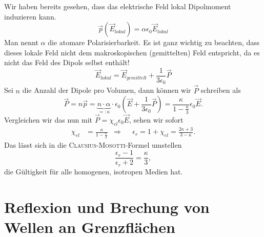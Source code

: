 Wir haben bereits gesehen, dass das elektrische Feld lokal Dipolmoment induzieren kann.
\begin{equation*}
\vec{p}\left(\vec{E}_\textit{lokal}\right) = \alpha\epsilon_0\vec{E}_\textit{lokal}
\end{equation*}
Man nennt $\alpha$ die atomare Polarisierbarkeit. Es ist ganz wichtig zu beachten, dass dieses lokale Feld nicht dem makroskopischen (gemittelten) Feld entspricht, da es nicht das Feld des Dipols selbst enthält! \\
\begin{equation*}
\vec{E}_\textit{lokal}=\vec{E}_\textit{gemittelt} + \frac{1}{3\epsilon_0}\vec{P}
\end{equation*}
Sei $n$ die Anzahl der Dipole pro Volumen, dann können wir $\vec{P}$ schreiben als
\begin{equation*}
\vec{P}=n\vec{p} = \underbrace{n\cdot\alpha}_{=:\kappa}\cdot\epsilon_0\left(\vec{E}+\frac{1}{3\epsilon_0}\vec{P}\right) =\frac{\kappa}{1-\frac{\kappa}{3}}\epsilon_0\vec{E}.
\end{equation*}
Vergleichen wir das nun mit $\vec{P}=\chi_\textit{el}\epsilon_0\vec{E}$, sehen wir sofort
\begin{align*}
\chi_\textit{el}&=\frac{\kappa}{1-\frac{\kappa}{3}} &\Rightarrow& &\epsilon_r = 1+ \chi_\textit{el}=\frac{2\kappa+3}{3-\kappa}.
\end{align*}
Das lässt sich in die \textsc{Clausius-Mosotti}-Formel umstellen
\begin{equation*}
\frac{\epsilon_r-1}{\epsilon_r+2}=\frac{\kappa}{3},
\end{equation*}
die Gültigkeit für alle homogenen, isotropen Medien hat.

\section{Reflexion und Brechung von Wellen an Grenzflächen}

